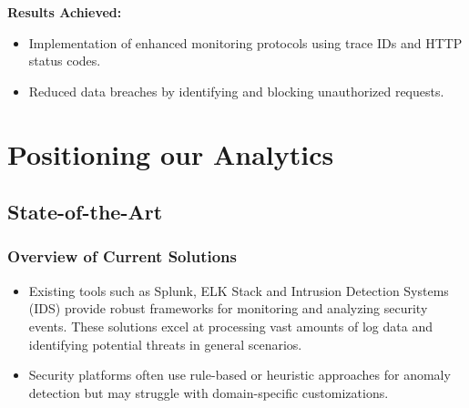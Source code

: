 \textbf{Results Achieved:}
\begin{itemize}
	\item Implementation of enhanced monitoring protocols using trace IDs and HTTP status codes.
	\item Reduced data breaches by identifying and blocking unauthorized requests.
\end{itemize}

\chapter{Positioning our Analytics}



\section{State-of-the-Art}

\subsection{Overview of Current Solutions}
\begin{itemize}
	\item Existing tools such as Splunk, ELK Stack \cite{IEEE:2022} and Intrusion Detection Systems (IDS) \cite{IEEE:2020} provide robust frameworks for monitoring and analyzing security events. These solutions excel at processing vast amounts of log data and identifying potential threats in general scenarios.
	\item Security platforms often use rule-based or heuristic approaches for anomaly detection but may struggle with domain-specific customizations.
\end{itemize}

